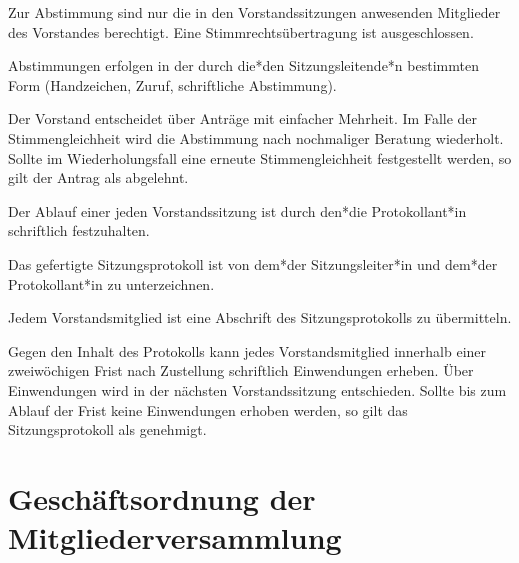 \begin{gfvorstand}

  Zur Abstimmung sind nur die in den Vorstandssitzungen anwesenden Mitglieder des Vorstandes berechtigt. Eine Stimmrechtsübertragung ist ausgeschlossen.

  Abstimmungen erfolgen in der durch die*den Sitzungsleitende*n bestimmten Form (Handzeichen, Zuruf, schriftliche Abstimmung).

  Der Vorstand entscheidet über Anträge mit einfacher Mehrheit. Im Falle der Stimmengleichheit wird die Abstimmung nach nochmaliger Beratung wiederholt. Sollte im Wiederholungsfall eine erneute Stimmengleichheit festgestellt werden, so gilt der Antrag als abgelehnt.


  Der Ablauf einer jeden Vorstandssitzung ist durch den*die Protokollant*in schriftlich festzuhalten.

  Das gefertigte Sitzungsprotokoll ist von dem*der Sitzungsleiter*in und dem*der Protokollant*in zu unterzeichnen.

  Jedem Vorstandsmitglied ist eine Abschrift des Sitzungsprotokolls zu übermitteln.

  Gegen den Inhalt des Protokolls kann jedes Vorstandsmitglied innerhalb einer zweiwöchigen Frist nach Zustellung schriftlich Einwendungen erheben. Über Einwendungen wird in der nächsten Vorstandssitzung entschieden. Sollte bis zum Ablauf der Frist keine Einwendungen erhoben werden, so gilt das Sitzungsprotokoll als genehmigt.

\end{gfvorstand}

\section{Geschäftsordnung der Mitgliederversammlung}


